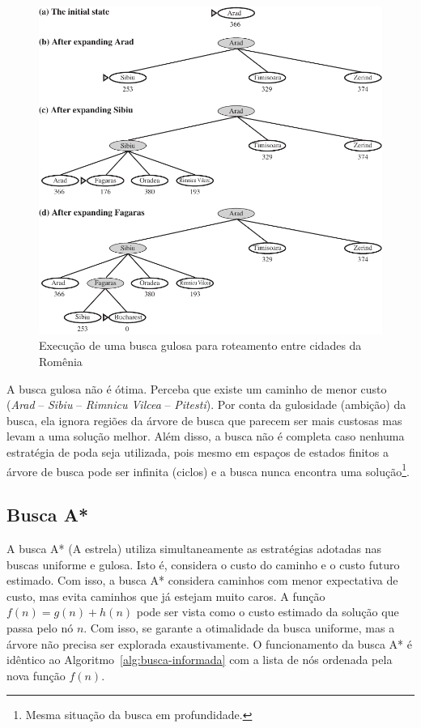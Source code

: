 \begin{figure}[h]
	\centering
	\includegraphics[width=\textwidth]{img/execucao-busca-gulosa}
	\caption{Execução de uma busca gulosa para roteamento entre cidades da Romênia}
	\label{fig:execucao-busca-gulosa}
\end{figure}

A busca gulosa não é ótima. Perceba que existe um caminho de menor custo (\textit{Arad} -- \textit{Sibiu} -- \textit{Rimnicu Vilcea} -- \textit{Pitesti}). Por conta da gulosidade (ambição) da busca, ela ignora regiões da árvore de busca que parecem ser mais custosas mas levam a uma solução melhor. Além disso, a busca não é completa caso nenhuma estratégia de poda seja utilizada, pois mesmo em espaços de estados finitos a árvore de busca pode ser infinita (ciclos) e a busca nunca encontra uma solução\footnote{Mesma situação da busca em profundidade.}.

\subsection{Busca A*}

A busca A* (A estrela) utiliza simultaneamente as estratégias adotadas nas buscas uniforme e gulosa. Isto é, considera o custo do caminho e o custo futuro estimado. Com isso, a busca A* considera caminhos com menor expectativa de custo, mas evita caminhos que já estejam muito caros. A função $f(n) = g(n) + h(n)$ pode ser vista como o custo estimado da solução que passa pelo nó $n$. Com isso, se garante a otimalidade da busca uniforme, mas a árvore não precisa ser explorada exaustivamente. O funcionamento da busca A* é idêntico ao Algoritmo~\ref{alg:busca-informada} com a lista de nós ordenada pela nova função $f(n)$.

